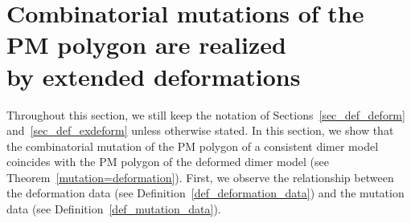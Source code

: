 \section[Combinatorial mutations of the PM polygon are realized\\ by extended deformations]{Combinatorial mutations of the PM polygon are realized\\ by extended deformations}
\label{mutation_vs_deformation}

Throughout this section, we still keep the notation of Sections~\ref{sec_def_deform} and~\ref{sec_def_exdeform} unless otherwise stated.
In this section, we show that the combinatorial mutation of the PM polygon of a consistent dimer model coincides with the PM polygon of the deformed dimer model (see Theorem~\ref{mutation=deformation}).
First, we observe the relationship between the deformation data (see Definition~\ref{def_deformation_data}) and the mutation data (see Definition~\ref{def_mutation_data}).

